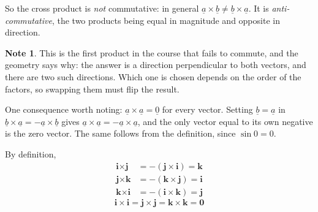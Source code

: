 \documentclass[11pt,a4paper]{article}
\theoremstyle{definition}
\newtheorem{note}[thm]{Note}
\begin{document}
So the cross product is \emph{not} commutative: in general
$\underline{a}\times\underline{b}\neq\underline{b}\times\underline{a}$. It is
\emph{anti-commutative}, the two products being equal in magnitude and opposite in
direction.

\begin{note}
This is the first product in the course that fails to commute, and the geometry
says why: the answer is a direction perpendicular to both vectors, and there are
two such directions. Which one is chosen depends on the order of the factors, so
swapping them must flip the result.

One consequence worth noting: $\underline{a}\times\underline{a}=\underline{0}$ for
every vector. Setting $\underline{b}=\underline{a}$ in
$\underline{b}\times\underline{a}=-\underline{a}\times\underline{b}$ gives
$\underline{a}\times\underline{a}=-\underline{a}\times\underline{a}$, and the only
vector equal to its own negative is the zero vector. The same follows from the
definition, since $\sin 0=0$.
\end{note}

\begin{figure}[H]
\centering
{}
\end{figure}


















By definition, 
\begin{align*}
\textbf{i} \times \textbf{j} & = -\left(\textbf{j} \times \textbf{i}\right) = \textbf{k}\\
\textbf{j} \times \textbf{k} & = -\left(\textbf{k} \times \textbf{j}\right) = \textbf{i}\\
\textbf{k} \times \textbf{i} & = -\left(\textbf{i} \times \textbf{k}\right) = \textbf{j}
\end{align*}
$$\textbf{i} \times \textbf{i} = \textbf{j} \times \textbf{j} = \textbf{k} \times \textbf{k} = \textbf{0}$$\\
\end{document}
